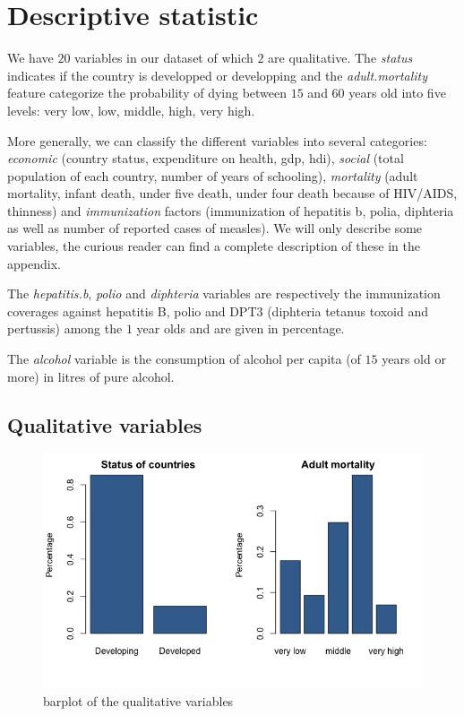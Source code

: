 \section{Descriptive statistic}

We have $20$ variables in our dataset of which $2$ are qualitative. The \textit{status} indicates if the country is developped or developping and the \textit{adult.mortality} feature categorize the probability of dying between $15$ and $60$ years old into five levels: very low, low, middle, high, very high. 

More generally, we can classify the different variables into several categories: \textit{economic} (country status, expenditure on health, gdp, hdi), \textit{social} (total population of each country, number of years of schooling), \textit{mortality} (adult mortality, infant death, under five death, under four death because of HIV/AIDS, thinness) and \textit{immunization} factors (immunization of hepatitis b, polia, diphteria as well as number of reported cases of measles). We will only describe some variables, the curious reader can find a complete description of these in the appendix.

The \textit{hepatitis.b}, \textit{polio} and \textit{diphteria} variables are respectively the immunization coverages against hepatitis B, polio and DPT3 (diphteria tetanus toxoid and pertussis) among the $1$ year olds and are given in percentage.

The \textit{alcohol} variable is the consumption of alcohol per capita (of $15$ years old or more) in litres of pure alcohol.

\subsection{Qualitative variables}

\begin{figure}[H]
	\centering
	\includegraphics{figures/eda/histogram_qualitative_variables.png}
	\caption{barplot of the qualitative variables}
	\label{fig:qualitative_variables_barplot}
\end{figure}

